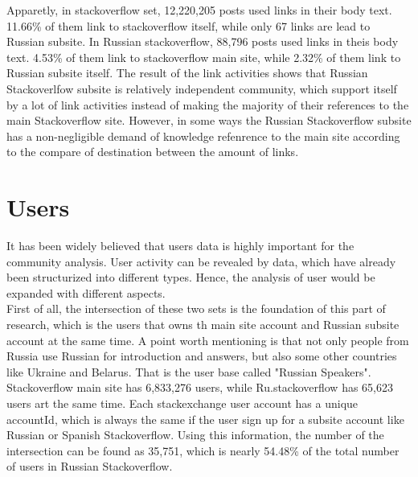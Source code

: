 \documentclass[A4paper,twoside,twocolumn]{article}
\begin{document}
Apparetly, in stackoverflow set, 12,220,205 posts used links in their body text. 11.66\% of them link to stackoverflow itself, while only 67 links are lead to Russian subsite. In Russian stackoverflow, 88,796 posts used links in theis body text. 4.53\% of them link to stackoverflow main site, while 2.32\% of them link to Russian subsite itself. The result of the link activities shows that Russian Stackoverlfow subsite is relatively independent community, which support itself by a lot of link activities instead of making the majority of their references to the main Stackoverflow site. However, in some ways the Russian Stackoverflow subsite has a non-negligible demand of knowledge refenrence to the main site according to the compare of destination between the amount of links.
		
\section{Users}
It has been widely believed that users data is highly important for the community analysis. User activity can be revealed by data, which have already been structurized into different types. Hence, the analysis of user would be expanded with different aspects.
\\First of all, the intersection of these two sets is the foundation of this part of research, which is the users that owns th main site account and Russian subsite account at the same time. A point worth mentioning is that not only people from Russia use Russian for introduction and answers, but also some other countries like Ukraine and Belarus. That is the user base called "Russian Speakers".
\\Stackoverflow main site has 6,833,276 users, while Ru.stackoverflow has 65,623 users art the same time. Each stackexchange user account has a unique accountId, which is always the same if the user sign up for a subsite account like Russian or Spanish Stackoverflow. Using this information, the number of the intersection can be found as 35,751, which is nearly 54.48\% of the total number of users in Russian Stackoverflow. 
\end{document}
